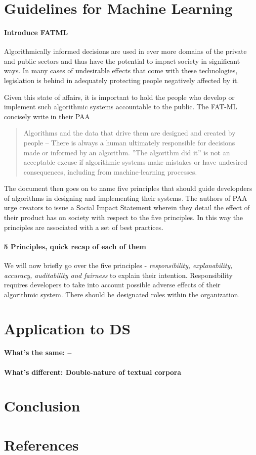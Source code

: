 \documentclass{article}
\begin{document}
\section{Guidelines for Machine Learning}\hypertarget{sec2}{}
\paragraph{Introduce FATML}
Algorithmically informed decisions are used in ever more domains of the private and public sectors and thus have the potential to impact society in significant ways. In many cases of undesirable effects that come with these technologies, legislation is behind in adequately protecting people negatively affected by it.

Given this state of affairs, it is important to hold the people who develop or implement such algorithmic systems accountable to the public. The FAT-ML concisely write in their PAA \cite{principles}
\begin{quote}
Algorithms and the data that drive them are designed and created by people -- There is always a human ultimately responsible for decisions made or informed by an algorithm. ''The algorithm did it'' is not an acceptable excuse if algorithmic systems make mistakes or have undesired consequences, including from machine-learning processes.
\end{quote}

The document then goes on to name five principles that should guide developders of algorithms in designing and implementing their systems. The authors of PAA urge creators to issue a Social Impact Statement wherein they detail the effect of their product has on society with respect to the five principles. In this way the principles are associated with a set of best practices.
\paragraph{5 Principles, quick recap of each of them}
We will now briefly go over the five principles - \emph{responsibility, explanability, accuracy, auditability and fairness} to explain their intention.
Responsibility requires developers to take into account possible adverse effects of their algorithmic system. There should be designated roles within the organization.


\section{Application to DS}\hypertarget{sec4}{ }
\paragraph{What's the same: --}
\paragraph{What's different: Double-nature of textual corpora}
\section{Conclusion}

\section{References}\hypertarget{sec5}{ }
\end{document}
